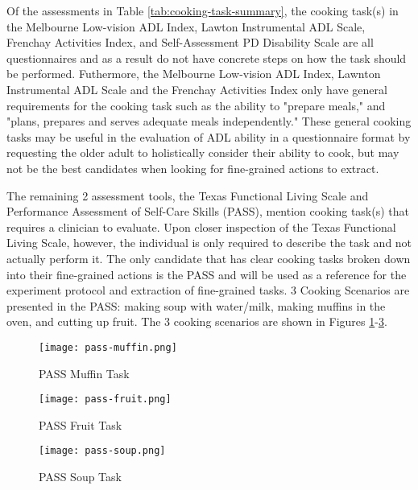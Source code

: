 Of the assessments in Table \ref{tab:cooking-task-summary}, the cooking task(s) in the Melbourne Low-vision ADL Index, Lawton Instrumental ADL Scale, Frenchay Activities Index, and Self-Assessment PD Disability Scale are all questionnaires and as a result do not have concrete steps on how the task should be performed. Futhermore, the Melbourne Low-vision ADL Index, Lawnton Instrumental ADL Scale and the Frenchay Activities Index only have general requirements for the cooking task such as the ability to "prepare meals," and "plans, prepares and serves adequate meals independently." These general cooking tasks may be useful in the evaluation of ADL ability in a questionnaire format by requesting the older adult to holistically consider their ability to cook, but may not be the best candidates when looking for fine-grained actions to extract. 

The remaining 2 assessment tools, the Texas Functional Living Scale and Performance Assessment of Self-Care Skills (PASS), mention cooking task(s) that requires a clinician to evaluate. Upon closer inspection of the Texas Functional Living Scale, however, the individual is only required to describe the task and not actually perform it. The only candidate that has clear cooking tasks broken down into their fine-grained actions is the PASS and will be used as a reference for the experiment protocol and extraction of fine-grained tasks. 3 Cooking Scenarios are presented in the PASS: making soup with water/milk, making muffins in the oven, and cutting up fruit. The 3 cooking scenarios are shown in Figures \ref{fig:PASS-muffin}-\ref{fig:PASS-soup}.

\begin{figure}[ht]
    \centering
    \texttt{[image: pass-muffin.png]}
    \caption{PASS Muffin Task \cite{rogers_performance_2014}}
    \label{fig:PASS-muffin}
\end{figure}


\begin{figure}[ht]
    \centering
    \texttt{[image: pass-fruit.png]}
    \caption{PASS Fruit Task \cite{rogers_performance_2014}}
    \label{fig:PASS-fruit}
\end{figure}

\begin{figure}[ht]
    \centering
    \texttt{[image: pass-soup.png]}
    \caption{PASS Soup Task \cite{rogers_performance_2014}}
    \label{fig:PASS-soup}
\end{figure}

